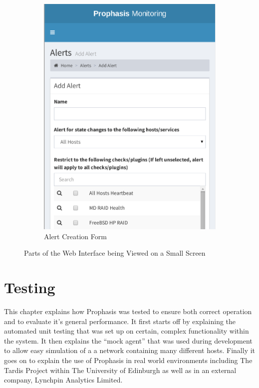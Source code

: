 \documentclass[bsc,deptreport,twoside,parskip,singlespacing,notimes]{infthesis}
\begin{document}
\begin{figure}
    \begin{subfigure}[b]{0.5\textwidth}
        \includegraphics[width=\textwidth]{assets/screenshots/responsive-alert-form.pdf}
        \caption{Alert Creation Form}
        \label{responsive-alert-form}
    \end{subfigure}
    \caption{Parts of the Web Interface being Viewed on a Small Screen}\label{fig:animals}
\end{figure}


\chapter{Testing}
	This chapter explains how Prophasis was tested to ensure both correct operation
	and to evaluate it's general performance.  It first starts off by explaining
	the automated unit testing that was set up on certain, complex functionality
	within the system.  It then explains the ``mock agent'' that was used during
	development to allow easy simulation of a a network containing many different
	hosts.  Finally it goes on to explain the use of Prophasis in real world 
	environments including The Tardis Project within The University of Edinburgh
	as well as in an external company, Lynchpin Analytics Limited.
\end{document}
